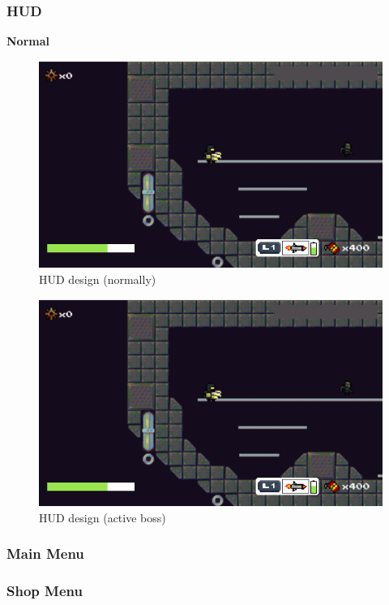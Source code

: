\documentclass[../Main.tex]{subfiles}
\begin{document}
\subsubsection{HUD}

\textbf{Normal}

\begin{figure}[H]
	\centering
	\includegraphics[width=\columnwidth]{Figures/HUD.png}
	\caption{HUD design (normally)}
\end{figure}


\begin{figure}[H]
	\centering
	\includegraphics[width=\columnwidth]{Figures/HUD.png}
	\caption{HUD design (active boss)}
\end{figure}

\subsubsection{Main Menu}
\subsubsection{Shop Menu}
\end{document}
